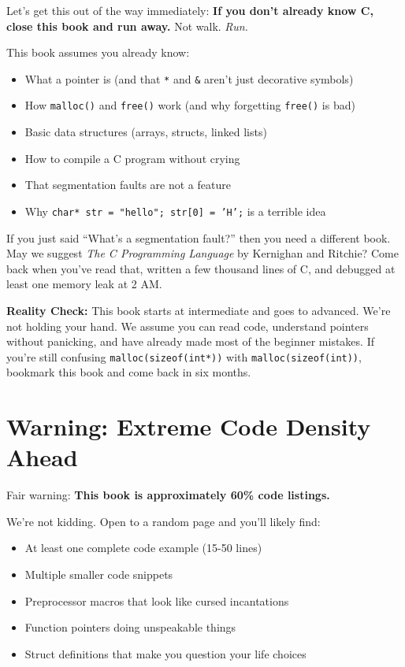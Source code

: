 \documentclass[11pt,openany]{book}
\begin{document}
Let's get this out of the way immediately: \textbf{If you don't already know C, close this book and run away.} Not walk. \textit{Run.}

This book assumes you already know:
\begin{itemize}
    \item What a pointer is (and that \texttt{*} and \texttt{\&} aren't just decorative symbols)
    \item How \texttt{malloc()} and \texttt{free()} work (and why forgetting \texttt{free()} is bad)
    \item Basic data structures (arrays, structs, linked lists)
    \item How to compile a C program without crying
    \item That segmentation faults are not a feature
    \item Why \texttt{char* str = "hello"; str[0] = 'H';} is a terrible idea
\end{itemize}

If you just said ``What's a segmentation fault?'' then you need a different book. May we suggest \textit{The C Programming Language} by Kernighan and Ritchie? Come back when you've read that, written a few thousand lines of C, and debugged at least one memory leak at 2 AM.

\begin{warningbox}
\textbf{Reality Check:} This book starts at intermediate and goes to advanced. We're not holding your hand. We assume you can read code, understand pointers without panicking, and have already made most of the beginner mistakes. If you're still confusing \texttt{malloc(sizeof(int*))} with \texttt{malloc(sizeof(int))}, bookmark this book and come back in six months.
\end{warningbox}

\section*{Warning: Extreme Code Density Ahead}

Fair warning: \textbf{This book is approximately 60\% code listings.}

We're not kidding. Open to a random page and you'll likely find:
\begin{itemize}
    \item At least one complete code example (15-50 lines)
    \item Multiple smaller code snippets
    \item Preprocessor macros that look like cursed incantations
    \item Function pointers doing unspeakable things
    \item Struct definitions that make you question your life choices
\end{itemize}
\end{document}
